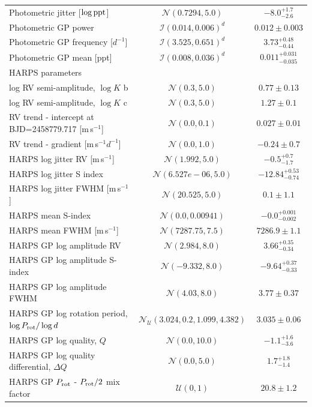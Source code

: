 \documentclass[fleqn,usenatbib]{mnras}
\newcommand{\harps}{{HARPS}}
\newcommand{\ms}{m\,s$^{-1}$}
\newcommand{\TlogKzero}{ $ 0.77 \pm 0.13 $ }
\newcommand{\TlogKone}{ $ 1.27 \pm 0.1 $ }
\newcommand{\Trvlogerrcontrzero}{ $ -0.5^{+0.7}_{-1.7} $ }
\newcommand{\Trvlogerrcontrone}{ $ -12.84^{+0.53}_{-0.74} $ }
\newcommand{\Trvlogerrcontrtwo}{ $ 0.1 \pm 1.1 $ }
\newcommand{\Tphotlogerrcontr}{ $ -8.0^{+1.7}_{-2.6} $ }
\newcommand{\Tmeans}{ $ -0.0^{+0.001}_{-0.002} $ }
\newcommand{\Tmeanfwhm}{ $ 7286.9 \pm 1.1 $ }
\newcommand{\Tlogamprv}{ $ 3.66^{+0.35}_{-0.34} $ }
\newcommand{\Tlogamps}{ $ -9.64^{+0.37}_{-0.33} $ }
\newcommand{\Tlogampfwhm}{ $ 3.77 \pm 0.37 $ }
\newcommand{\TlogQzero}{ $ -1.1^{+1.6}_{-3.6} $ }
\newcommand{\TdeltaQ}{ $ 1.7^{+1.8}_{-1.4} $ }
\newcommand{\Tperiod}{ $ 20.8 \pm 1.2 $ }
\newcommand{\Tlogperiod}{ $ 3.035 \pm 0.06 $ }
\newcommand{\TphotSzero}{ $ 0.012 \pm 0.003 $ }
\newcommand{\Tphotwzero}{ $ 3.73^{+0.48}_{-0.44} $ }
\newcommand{\Tphotmean}{ $ 0.011^{+0.031}_{-0.035} $ }
\newcommand{\Trvtrendzero}{ $ 0.027 \pm 0.01 $ }
\newcommand{\Trvtrendone}{ $ -0.24 \pm 0.7 $ }
\begin{document}
\begin{table}
\begin{center}
\begin{tabular}{lcc}
Photometric jitter [$\log{\rm ppt}$] &  $\mathcal{N}(0.7294,5.0)$  &  \Tphotlogerrcontr{} \\
Photometric GP power & $\mathcal{I}(0.014,0.006)^{d}$  & \TphotSzero{} \\
Photometric GP frequency [$d^{-1}$] & $\mathcal{I}(3.525,0.651)^{d}$  &   \Tphotwzero{} \\
Photometric GP mean [ppt] & $\mathcal{I}(0.008,0.036)^{d}$  & \Tphotmean{} \\
\hline
\multicolumn{3}{l}{\harps{} parameters}\\
log RV semi-amplitude, $\log{K}$ b &  $\mathcal{N}(0.3,5.0)$  &   \TlogKzero{} \\
log RV semi-amplitude, $\log{K}$ c &  $\mathcal{N}(0.3,5.0)$  &   \TlogKone{} \\
RV trend - intercept at BJD=2458779.717 [\ms{}] &  $\mathcal{N}(0.0,0.1)$  & \Trvtrendzero{} \\
RV trend - gradient [\ms{}$d^{-1}$] &  $\mathcal{N}(0.0,1.0)$  &   \Trvtrendone{} \\
\harps{} log jitter RV [\ms{}] &  $\mathcal{N}(1.992,5.0)$  &   \Trvlogerrcontrzero{} \\
\harps{} log jitter S index &  $\mathcal{N}(6.527e-06,5.0)$  &  \Trvlogerrcontrone{} \\
\harps{} log jitter FWHM [\ms{}] &  $\mathcal{N}(20.525,5.0)$  &   \Trvlogerrcontrtwo{} \\
\harps{} mean S-index &  $\mathcal{N}(0.0,0.00941)$  &  \Tmeans{} \\
\harps{} mean FWHM [\ms{}] &  $\mathcal{N}(7287.75,7.5)$  &  \Tmeanfwhm{} \\
\harps{} GP log amplitude RV &  $\mathcal{N}(2.984,8.0)$  &  \Tlogamprv{} \\
\harps{} GP log amplitude S-index &  $\mathcal{N}(-9.332,8.0)$  & \Tlogamps{} \\
\harps{} GP log amplitude FWHM &  $\mathcal{N}(4.03,8.0)$  & \Tlogampfwhm{}  \\
\harps{} GP log rotation period, $\log{P_{\rm rot}}/\log{d}$ &  $\mathcal{N}_{\mathcal{U}}(3.024,0.2,1.099,4.382)$  & \Tlogperiod{} \\
\harps{} GP log quality, $Q$ &  $\mathcal{N}(0.0,10.0)$  &  \TlogQzero{} \\
\harps{} GP log quality differential, $\Delta Q$ &  $\mathcal{N}(0.0,5.0)$  & \TdeltaQ{}{} \\
\harps{} GP $P_{\rm rot}$ - $P_{\rm rot}/2$ mix factor &  $\mathcal{U}(0,1)$  & \Tperiod{} \\

\end{tabular}
\end{center}
\end{table}
\end{document}
